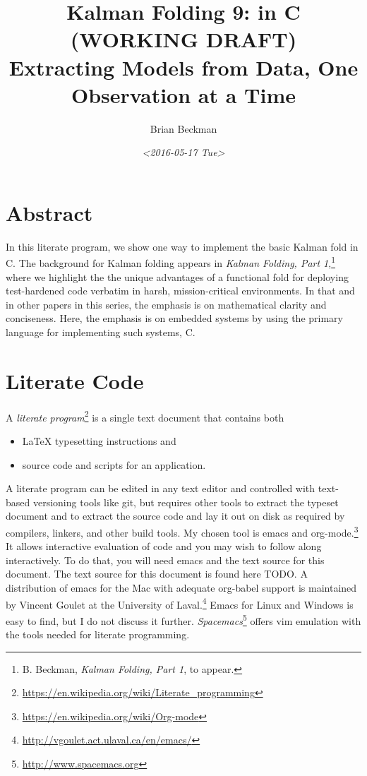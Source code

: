 \documentclass[10pt,oneside,x11names]{article}
\author{Brian Beckman}
\date{\textit{<2016-05-17 Tue>}}
\title{Kalman Folding 9: in C (WORKING DRAFT)\\\medskip
\large Extracting Models from Data, One Observation at a Time}
\begin{document}
\maketitle
\setcounter{tocdepth}{2}
\tableofcontents


\section{Abstract}
\label{sec:orgheadline1}

In this literate program, we show one way to implement the basic Kalman fold in C.
The background for Kalman folding appears in \emph{Kalman Folding, Part 1},\footnote{B. Beckman, \emph{Kalman Folding, Part 1}, to appear.}
where we highlight the the unique advantages of a functional fold for deploying
test-hardened code verbatim in harsh, mission-critical environments. In that and
in other papers in this series, the emphasis is on mathematical clarity and
conciseness. Here, the emphasis is on embedded systems by using the primary
language for implementing such systems, C.

\section{Literate Code}
\label{sec:orgheadline2}

A \emph{literate program}\footnote{\url{https://en.wikipedia.org/wiki/Literate_programming}} is a single text document that contains both 
\begin{itemize}
\item \LaTeX{} typesetting instructions and
\item source code and scripts for an application.
\end{itemize}
A literate program can
be edited in any text editor and controlled with text-based versioning tools
like git, but requires other tools to extract the typeset document and to
extract the source code and lay it out on disk as required by compilers,
linkers, and other build tools. My chosen tool is emacs and org-mode.\footnote{\url{https://en.wikipedia.org/wiki/Org-mode}}
It allows interactive evaluation of code and you may wish to follow along
interactively. To do that, you will need emacs and the text source for this
document. The text source for this document is found here TODO. A distribution
of emacs for the Mac with adequate org-babel support is maintained by Vincent
Goulet at the University of Laval.\footnote{\url{http://vgoulet.act.ulaval.ca/en/emacs/}} Emacs for Linux and Windows is easy
to find, but I do not discuss it further. \emph{Spacemacs}\footnote{\url{http://www.spacemacs.org}} offers vim
emulation with the tools needed for literate programming.
\end{document}
